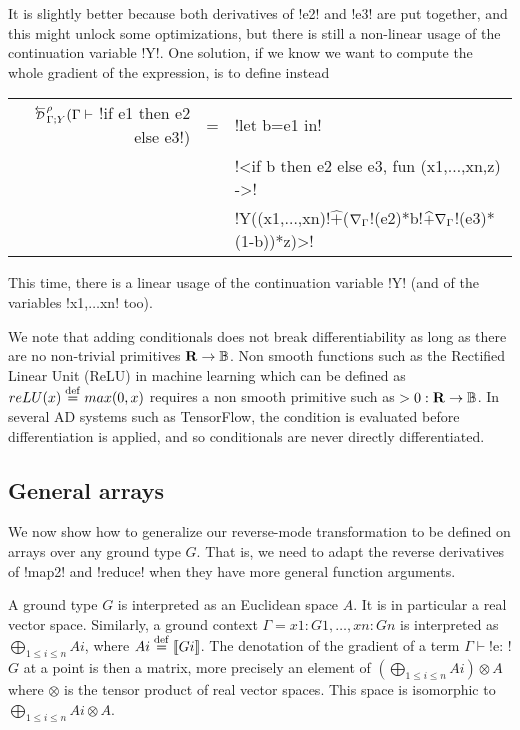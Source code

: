 It is slightly better because both derivatives of !e2! and !e3! are put together, and this might unlock some optimizations, 
but there is still a non-linear usage of the continuation variable !Y!.
One solution, if we know we want to compute the whole gradient of the expression, is to define instead

\begin{tabular}{r c l}
    $\directD{\rho}{\Gamma}{Y}(\Gamma \vdash$ !if e1 then e2 else e3!) 
    &=& !let b=e1 in!   \\
    && !<if b then e2 else e3, fun (x1,$\ldots$,xn,z) ->! \\
    && !Y((x1,$\ldots$,xn)!$\widehat{+}$($\nabla_\Gamma$!(e2)*b!$\widehat{+}\nabla_\Gamma$!(e3)*(1-b))*z)>!\\
\end{tabular}

This time, there is a linear usage of the continuation variable !Y! (and of the variables !x1,$\ldots$xn! too).

We note that adding conditionals does not break differentiability as long as there are no non-trivial primitives $\mathbf{R}\to\mathbb{B}$.
Non smooth functions such as the Rectified Linear Unit (ReLU) in machine learning which can be defined as $reLU(x)\stackrel {\mathrm{def}}= max(0,x)$ 
requires a non smooth primitive such as $>0: \mathbf{R}\to\mathbb{B}$. In several AD systems such as TensorFlow, 
the condition is evaluated before differentiation is applied, and so conditionals are never directly differentiated.

\subsection{General arrays} %
\label{sub:Adding general arrays}

We now show how to generalize our reverse-mode transformation to be defined on arrays over any ground type $G$.
That is, we need to adapt the reverse derivatives of !map2! and !reduce! when they have more general function arguments.

A ground type $G$ is interpreted as an Euclidean space $A$. 
It is in particular a real vector space.
Similarly, a ground context $\Gamma=x1:G1,\ldots,xn:Gn$ is interpreted as $\bigoplus_{1\leq i\leq n}Ai$, where $Ai\stackrel {\mathrm{def}}=\llbracket Gi\rrbracket$.
The denotation of the gradient of a term $\Gamma \vdash$!e: !$G$ at a point is then a matrix, more precisely an element of $(\bigoplus_{1\leq i\leq n}Ai)\otimes A$
where $\otimes$ is the tensor product of real vector spaces. This space is isomorphic to $\bigoplus_{1\leq i\leq n}Ai\otimes A$.

